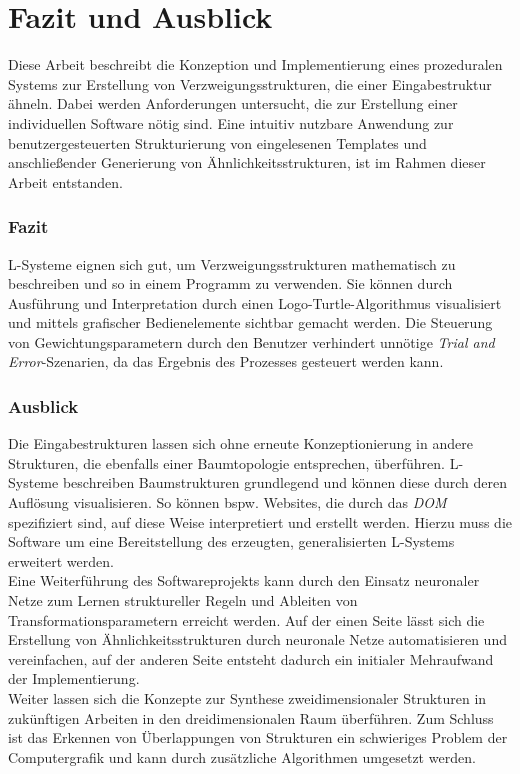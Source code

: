 
\chapter{Fazit und Ausblick}
Diese Arbeit beschreibt die Konzeption und Implementierung eines prozeduralen Systems zur Erstellung
von Verzweigungsstrukturen, die einer Eingabestruktur ähneln.
Dabei werden Anforderungen untersucht, die zur Erstellung einer individuellen Software nötig sind.
Eine intuitiv nutzbare Anwendung zur benutzergesteuerten Strukturierung von eingelesenen Templates und
anschließender Generierung von Ähnlichkeitsstrukturen, ist im Rahmen dieser Arbeit entstanden.

\subsection*{Fazit}
L-Systeme eignen sich gut, um Verzweigungsstrukturen mathematisch zu beschreiben und so in einem
Programm zu verwenden.
Sie können durch Ausführung und Interpretation durch einen Logo-Turtle-Algorithmus visualisiert
und mittels grafischer Bedienelemente sichtbar gemacht werden.
Die Steuerung von Gewichtungsparametern durch den Benutzer verhindert unnötige
\textit{Trial and Error}-Szenarien, da das Ergebnis des Prozesses gesteuert werden kann.

\subsection*{Ausblick}
Die Eingabestrukturen lassen sich ohne erneute Konzeptionierung in andere Strukturen, die ebenfalls
einer Baumtopologie entsprechen, überführen.
L-Systeme beschreiben Baumstrukturen grundlegend und können diese durch deren Auflösung visualisieren.
So können bspw. Websites, die durch das \textit{DOM} spezifiziert sind, auf diese Weise interpretiert
und erstellt werden.
Hierzu muss die Software um eine Bereitstellung des erzeugten, generalisierten L-Systems erweitert
werden.\\
Eine Weiterführung des Softwareprojekts kann durch den Einsatz neuronaler Netze zum Lernen
struktureller Regeln und Ableiten von Transformationsparametern erreicht werden.
Auf der einen Seite lässt sich die Erstellung von Ähnlichkeitsstrukturen durch neuronale Netze
automatisieren und vereinfachen, auf der anderen Seite entsteht dadurch ein initialer Mehraufwand
der Implementierung.\\
Weiter lassen sich die Konzepte zur Synthese zweidimensionaler Strukturen in zukünftigen Arbeiten
in den dreidimensionalen Raum überführen.
Zum Schluss ist das Erkennen von Überlappungen von Strukturen ein schwieriges Problem der
Computergrafik und kann durch zusätzliche Algorithmen umgesetzt werden.